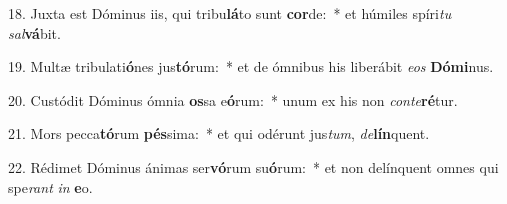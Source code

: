 18. Juxta est Dóminus iis, qui tribu\textbf{lá}to sunt \textbf{cor}de:~*  et húmiles spíri\textit{tu} \textit{sal}\textbf{vá}bit.\

19. Multæ tribulati\textbf{ó}nes jus\textbf{tó}rum:~*  et de ómnibus his liberábit \textit{e}\textit{os} \textbf{Dó}\textbf{mi}nus.\

20. Custódit Dóminus ómnia \textbf{os}sa e\textbf{ó}rum:~*  unum ex his non \textit{con}\textit{te}\textbf{ré}tur.\

21. Mors pecca\textbf{tó}rum \textbf{pés}sima:~*  et qui odérunt jus\textit{tum}, \textit{de}\textbf{lín}quent.\

22. Rédimet Dóminus ánimas ser\textbf{vó}rum su\textbf{ó}rum:~*  et non delínquent omnes qui spe\textit{rant} \textit{in} \textbf{e}o.\

